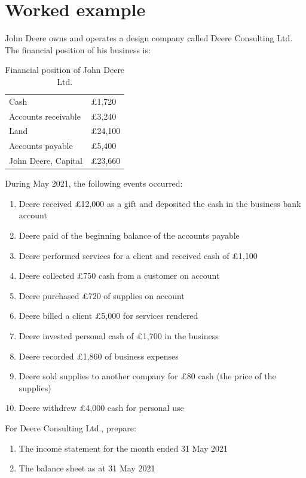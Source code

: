 \section{Worked example}
John Deere owns and operates a design company called Deere Consulting Ltd. The financial position of his business is:
\begin{table}[H]
    \centering
    \begin{tabular}[]{@{}ll@{}}
        \toprule
        Cash                & \pounds 1,720  \\
        Accounts receivable & \pounds 3,240  \\
        Land                & \pounds 24,100 \\
        Accounts payable    & \pounds 5,400  \\
        John Deere, Capital & \pounds 23,660 \\
        \bottomrule
    \end{tabular}
    \caption{Financial position of John Deere Ltd.}
\end{table}
During May 2021, the following events occurred:
\begin{enumerate}
    \item Deere received \pounds 12,000 as a gift and deposited the cash in the business bank account
    \item Deere paid of the beginning balance of the accounts payable
    \item Deere performed services for a client and received cash of \pounds 1,100
    \item Deere collected \pounds 750 cash from a customer on account
    \item Deere purchased \pounds 720 of supplies on account
    \item Deere billed a client \pounds 5,000 for services rendered
    \item Deere invested personal cash of \pounds 1,700 in the business
    \item Deere recorded \pounds 1,860 of business expenses
    \item Deere sold supplies to another company for \pounds 80 cash (the price of the supplies)
    \item Deere withdrew \pounds 4,000 cash for personal use
\end{enumerate}
For Deere Consulting Ltd., prepare:
\begin{enumerate}
    \item The income statement for the month ended 31 May 2021
    \item The balance sheet as at 31 May 2021
\end{enumerate}
